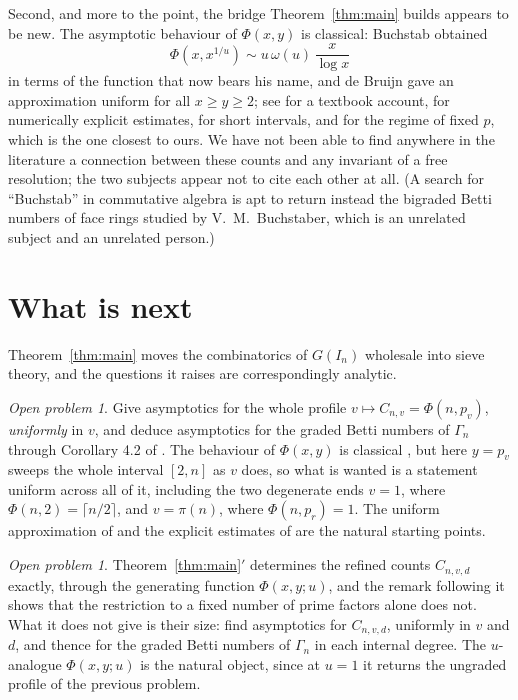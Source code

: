 \documentclass[a4paper,11pt,oneside,reqno]{amsart}
\theoremstyle{definition}
\theoremstyle{remark}
\newtheorem{openproblem}[definition]{Open problem}
\theoremstyle{plain}
\newcommand{\Gam}{\Gamma}
\begin{document}
Second, and more to the point, the bridge Theorem~\ref{thm:main} builds appears
to be new. The asymptotic behaviour of \(\Phi(x,y)\) is classical: Buchstab
\cite{Buchstab} obtained
\[
  \Phi(x,x^{1/u}) \sim u\,\omega(u)\,\frac{x}{\log x}
\]
in terms of the function that now bears his name, and de Bruijn \cite{deBruijn}
gave an approximation uniform for all \(x \ge y \ge 2\); see
\cite{Tenenbaum} for a textbook account, \cite{Fan} for numerically explicit
estimates, \cite{Gorodetsky} for short intervals, and \cite{Holt} for the
regime of fixed \(p\), which is the one closest to ours. We have not been able
to find anywhere in the literature a connection between these counts and any
invariant of a free resolution; the two subjects appear not to cite each other
at all. (A search for ``Buchstab'' in commutative algebra is apt to return
instead the bigraded Betti numbers of face rings studied by V.~M.~Buchstaber,
which is an unrelated subject and an unrelated person.)

\section{What is next}\label{sec:next}

Theorem~\ref{thm:main} moves the combinatorics of \(G(I_n)\) wholesale into
sieve theory, and the questions it raises are correspondingly analytic.

\begin{openproblem}
  Give asymptotics for the whole profile \(v\mapsto C_{n,v} = \Phi(n,p_v)\),
  \emph{uniformly} in \(v\), and deduce asymptotics for the graded Betti
  numbers of \(\Gam_n\) through Corollary 4.2 of \cite{Snellman2000}. The
  behaviour of \(\Phi(x,y)\) is classical \cite{Buchstab,deBruijn,Tenenbaum},
  but here \(y = p_v\) sweeps the whole interval \([2,n]\) as \(v\) does, so what
  is wanted is a statement uniform across all of it, including the two
  degenerate ends \(v = 1\), where \(\Phi(n,2) = \lceil n/2\rceil\), and
  \(v = \pi(n)\), where \(\Phi(n,p_{r}) = 1\). The uniform approximation of
  \cite{deBruijn} and the explicit estimates of \cite{Fan} are the natural
  starting points.
\end{openproblem}

\begin{openproblem}
  Theorem~\ref{thm:main}\({}'\) determines the refined counts \(C_{n,v,d}\)
  exactly, through the generating function \(\Phi(x,y;u)\), and the remark
  following it shows that the restriction to a fixed number of prime factors
  alone does not. What it does not give is their size: find
  asymptotics for \(C_{n,v,d}\), uniformly in \(v\) and \(d\), and thence for
  the graded Betti numbers of \(\Gam_n\) in each internal degree. The
  \(u\)-analogue \(\Phi(x,y;u)\) is the natural object, since at \(u = 1\) it
  returns the ungraded profile of the previous problem.
\end{openproblem}
\end{document}

